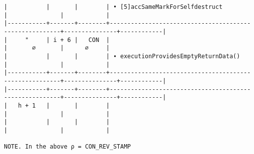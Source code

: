 \documentclass[varwidth=\maxdimen,margin=0.5cm,multi={verbatim}]{standalone}
\begin{document}
\begin{verbatim}
|           |       |        | • [5]accSameMarkForSelfdestruct                        |               |            |
|-----------+-------+--------+--------------------------------------------------------+---------------+------------|
|     "     | i + 6 |   CON  |                                                        |       ∅       |      ∅     |
|           |       |        | ∙ executionProvidesEmptyReturnData()                   |               |            |
|-----------+-------+--------+--------------------------------------------------------+---------------+------------|
|-----------+-------+--------+--------------------------------------------------------+---------------+------------|
|   h + 1   |       |        |                                                        |               |            |
|           |       |        |                                                        |               |            |

NOTE. In the above ρ = CON_REV_STAMP
\end{verbatim}
\end{document}
